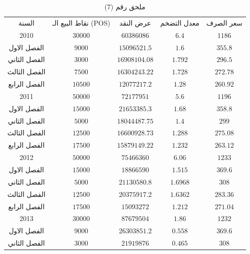 \documentclass[10pt,a4paper]{report}
\begin{document}
	\begin{longtable}{|c|c|c|c|c|}
	\captionsetup{font=Large}
	\caption*{ملحق رقم (7)} \\
	\hline
	\rowcolor[HTML]{DAE8FC} 
	السنة        & نقاط البيع الـ (POS) & عرض النقد     & معدل التضخم & سعر الصرف \\ \hline
	2010         & $30000$              & $60386086$    & $6.4$       & $1186$    \\ \hline
	الفصل الاول  & $9000$               & $15096521.5$  & $1.6$       & $355.8$   \\ \hline
	الفصل الثاني & $3000$               & $16908104.08$ & $1.792$     & $296.5$   \\ \hline
	الفصل الثالث & $7500$               & $16304243.22$ & $1.728$     & $272.78$  \\ \hline
	الفصل الرابع & $10500$              & $12077217.2$  & $1.28$      & $260.92$  \\ \hline
	2011         & $50000$              & $72177951$    & $5.6$       & $1196$    \\ \hline
	الفصل الاول  & $15000$              & $21653385.3$  & $1.68$      & $358.8$   \\ \hline
	الفصل الثاني & $5000$               & $18044487.75$ & $1.4$       & $299$     \\ \hline
	الفصل الثالث & $12500$              & $16600928.73$ & $1.288$     & $275.08$  \\ \hline
	الفصل الرابع & $17500$              & $15879149.22$ & $1.232$     & $263.12$  \\ \hline
	2012         & $50000$              & $75466360$    & $6.06$      & $1233$    \\ \hline
	الفصل الاول  & $15000$              & $18866590$    & $1.515$     & $369.6$   \\ \hline
	الفصل الثاني & $5000$               & $21130580.8$  & $1.6968$    & $308$     \\ \hline
	الفصل الثالث & $12500$              & $20375917.2$  & $1.6362$    & $283.36$  \\ \hline
	الفصل الرابع & $17500$              & $15093272$    & $1.212$     & $271.04$  \\ \hline
	2013         & $30000$              & $87679504$    & $1.86$      & $1232$    \\ \hline
	الفصل الاول  & $9000$               & $26303851.2$  & $0.558$     & $369.6$   \\ \hline
	الفصل الثاني & $3000$               & $21919876$    & $0.465$     & $308$     \\ \hline

\end{longtable}
\end{document}
